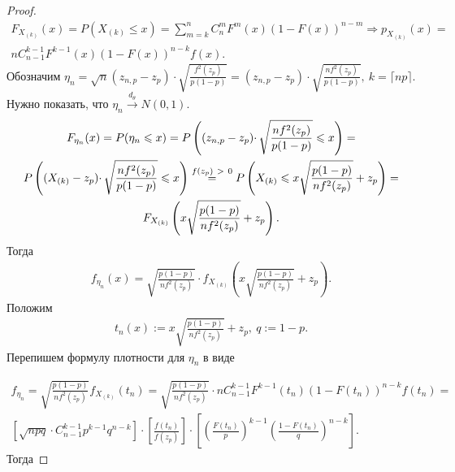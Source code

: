 \begin{proof}
\begin{gather*}
   F_{X_{( k)}}( x) =P( X_{( k)} \leqslant x) =\sum _{m=k}^{n} C_{n}^{m} F^{m}( x)( 1-F( x))^{n-m} \Rightarrow p_{X_{( k)}}( x) =\\ nC_{n-1}^{k-1} F^{k-1}( x)( 1-F( x))^{n-k} f( x). 
\end{gather*}
Обозначим $\displaystyle \eta _{n} =\sqrt{n}( z_{n,p} -z_{p}) \cdotp \sqrt{\frac{f^{2}( z_{p})}{p( 1-p)}} =( z_{n,p} -z_{p}) \cdotp \sqrt{\frac{nf^{2}( z_{p})}{p( 1-p)}},\ k=\lceil np\rceil $. Нужно показать, что $\displaystyle \eta _{n}\xrightarrow{d_{\theta }} N( 0,1)$.
\begin{gather*}
    F_{\eta _{n}}( x) = P( \eta _{n} \leqslant x) = P\left(( z_{n,p} -z_{p}) \cdotp \sqrt{\frac{nf^{2}( z_{p})}{p( 1-p)}} \leqslant x\right) =\\ P\left(( X_{( k)} -z_{p}) \cdotp \sqrt{\frac{nf^{2}( z_{p})}{p( 1-p)}} \leqslant x\right)\overset{f( z_{p}) \  >\ 0}{=}\notag P\left( X_{( k)} \leqslant x\sqrt{\frac{p( 1-p)}{nf^{2}( z_{p})}} +z_{p}\right) =\\ F_{X_{( k)}}\left( x\sqrt{\frac{p( 1-p)}{nf^{2}( z_{p})}} +z_{p}\right) .
\end{gather*}
 Тогда
 \begin{gather*}
     f_{\eta _{n}}( x) =\sqrt{\frac{p( 1-p)}{nf^{2}( z_{p})}}\cdot f_{X_{( k)}}\left( x\sqrt{\frac{p( 1-p)}{nf^{2}( z_{p})}} +z_{p}\right).
 \end{gather*} Положим 
\begin{gather*}
    t_{n}( x) :=x\sqrt{\frac{p( 1-p)}{nf^{2}( z_{p})}} +z_{p},\ q:=1-p.
\end{gather*} 
Перепишем формулу плотности для $\displaystyle \eta _{n}$ в виде

\begin{gather*}
f_{\eta _{n}} = \sqrt{\frac{p( 1-p)}{nf^{2}( z_{p})}} f_{X_{( k)}}( t_{n}) = \sqrt{\frac{p( 1-p)}{nf^{2}( z_{p})}} \cdotp nC_{n-1}^{k-1} F^{k-1}( t_{n})( 1-F( t_{n}))^{n-k} f( t_{n}) =\\ \left[\sqrt{npq} \cdotp C_{n-1}^{k-1} p^{k-1} q^{n-k}\right] \cdotp \left[\frac{f( t_{n})}{f( z_{p})}\right] \cdotp \left[\left(\frac{F( t_{n})}{p}\right)^{k-1}\left(\frac{1-F( t_{n})}{q}\right)^{n-k}\right] .
\end{gather*}
Тогда



\end{proof}
